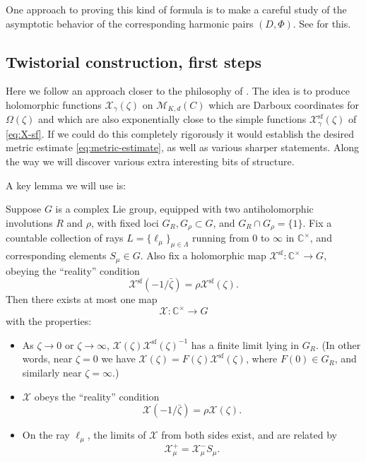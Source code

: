 \documentclass[12pt,letterpaper,reqno]{article}
\numberwithin{equation}{section}
\newcommand{\cM}{\ensuremath{\mathcal M}}
\newcommand{\cX}{\ensuremath{\mathcal X}}
\newcommand{\C}{\ensuremath{\mathbb C}}
\renewcommand{\sf}{\mathrm{sf}}
\begin{document}
One approach to proving this kind of formula
is to make a careful study of the asymptotic
behavior of the corresponding harmonic pairs $(D,\Phi)$.
See \cite{Mazzeo2014} for this.



\subsection{Twistorial construction, first steps}

Here we follow an approach closer to the philosophy of 
\cite{Gaiotto:2008cd}. The idea is to produce holomorphic functions
$\cX_\gamma(\zeta)$ on $\cM_{K,d}(C)$ which are Darboux coordinates for
$\Omega(\zeta)$ and which are also exponentially close
to the simple functions $\cX_\gamma^\sf(\zeta)$
of \eqref{eq:X-sf}. If we could do this completely rigorously
it would establish the desired metric estimate 
\eqref{eq:metric-estimate}, as well as various sharper
statements.
Along the way we will discover various
extra interesting bits of structure.

A key lemma we will use is:

\begin{lem} \label{lem:rh-uniqueness}
Suppose $G$ is a complex Lie group, equipped with two antiholomorphic
involutions $R$ and $\rho$, with fixed loci $G_R, G_\rho \subset G$,
and $G_R \cap G_\rho = \{1\}$.
Fix a countable collection of rays $L = \{\ell_\mu\}_{\mu \in \Lambda}$
running from $0$ to $\infty$ in $\C^\times$,
and corresponding elements $S_\mu \in G$.
Also fix a holomorphic map $\cX^\sf: \C^\times \to G$,
obeying the ``reality'' condition
\begin{equation} \label{eq:Xsf-reality}
  \cX^\sf(-1/\bar\zeta) = \rho \cX^\sf(\zeta).
\end{equation}
Then there exists at most one map
$$ \cX: \C^\times \to G $$
with the properties:
\begin{itemize}
\item As $\zeta \to 0$ or $\zeta \to \infty$, $\cX(\zeta) \cX^\sf(\zeta)^{-1}$ has a finite limit lying in $G_R$.
(In other words, near $\zeta = 0$ we have $\cX(\zeta) = F(\zeta) \cX^\sf(\zeta)$, where $F(0) \in G_R$, and similarly near $\zeta = \infty$.)
\item $\cX$ obeys the ``reality'' condition
\begin{equation} \label{eq:X-reality}
  \cX(-1/\bar\zeta) = \rho \cX(\zeta).
\end{equation}
\item On the ray $\ell_\mu$, the limits of $\cX$ from both sides 
exist, and are related by
\begin{equation}
  \cX^+_\mu = \cX^-_\mu S_\mu.
\end{equation}
\end{itemize}

\end{lem}
\end{document}
